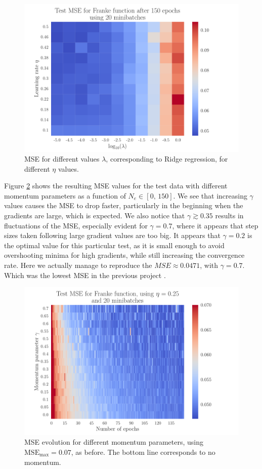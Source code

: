 \documentclass[12pt]{extarticle}
\begin{document}
\begin{figure}[h!]
	\includegraphics[width=0.9\linewidth]{SGD_Franke/reg_Franke__lambda_eta__Test_MSE__764274.pdf}
	\caption{MSE for different values $\lambda$, corresponding to Ridge regression, for different $\eta$ values.}
	\label{fig:SGD_Franke_lambda_eta}
\end{figure}

Figure \ref{fig:SGD_Franke_epochs_gamma} shows the resulting MSE values for the test data with different momentum parameters as a function of $N_e\in[0,\,150]$. We see that increasing $\gamma$ values causes the MSE to drop faster, particularly in the beginning when the gradients are large, which is expected. We also notice that $\gamma\gtrsim0.35$ results in fluctuations of the MSE, especially evident for $\gamma=0.7$, where it appears that step sizes taken following large gradient values are too big. It appears that $\gamma=0.2$ is the optimal value for this particular test, as it is small enough to avoid overshooting minima for high gradients, while still increasing the convergence rate. Here we actually manage to reproduce the $MSE \approx 0.0471$, with $\gamma = 0.7$. Which was the lowest MSE in the previous project \cite{project1}.

\begin{figure}[h!]
	\includegraphics[width=0.9\linewidth]{SGD_Franke/reg_Franke__epochs_gamma__Test_MSE__239373.pdf}
	\caption{MSE evolution for different momentum parameters, using $\mathrm{MSE}_\mathrm{max}=0.07$, as before. The bottom line corresponds to no momentum.}
	\label{fig:SGD_Franke_epochs_gamma}
\end{figure}
\end{document}

